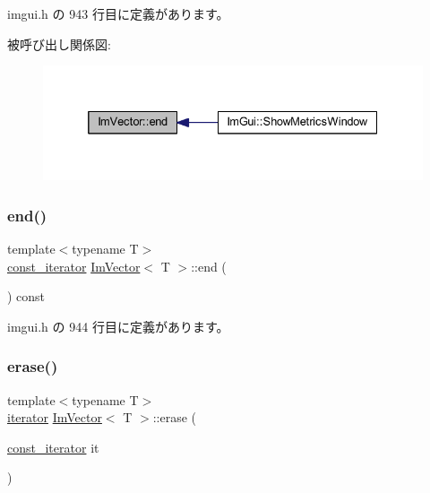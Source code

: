  imgui.\+h の 943 行目に定義があります。

被呼び出し関係図\+:\nopagebreak
\begin{figure}[H]
\begin{center}
\leavevmode
\includegraphics[width=332pt]{class_im_vector_a947fbc3b1d8c1997e51ae6caab440379_icgraph}
\end{center}
\end{figure}
\mbox{\label{class_im_vector_a06efa87357864d1c130f0f400eeccf8d}} 
\subsubsection{\texorpdfstring{end()}{end()}\hspace{0.1cm}{\footnotesize\ttfamily [2/2]}}
{\footnotesize\ttfamily template$<$typename T$>$ \\
\mbox{\hyperlink{class_im_vector_aedeac9c5080f9d6ce96ae837768ee4c4}{const\+\_\+iterator}} \mbox{\hyperlink{class_im_vector}{Im\+Vector}}$<$ T $>$\+::end (\begin{DoxyParamCaption}{ }\end{DoxyParamCaption}) const\hspace{0.3cm}{\ttfamily [inline]}}



 imgui.\+h の 944 行目に定義があります。

\mbox{\label{class_im_vector_a1e1fd9b678be9d4b4432fbefde976045}} 
\subsubsection{\texorpdfstring{erase()}{erase()}}
{\footnotesize\ttfamily template$<$typename T$>$ \\
\mbox{\hyperlink{class_im_vector_a74b5478f1f6fd471cc71219bce483db6}{iterator}} \mbox{\hyperlink{class_im_vector}{Im\+Vector}}$<$ T $>$\+::erase (\begin{DoxyParamCaption}\item[{\mbox{\hyperlink{class_im_vector_aedeac9c5080f9d6ce96ae837768ee4c4}{const\+\_\+iterator}}}]{it }\end{DoxyParamCaption})\hspace{0.3cm}{\ttfamily [inline]}}



